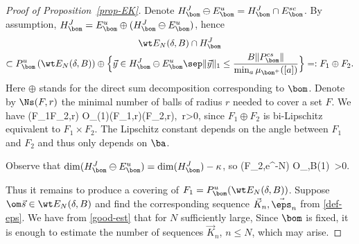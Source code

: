 \begin{proof}[Proof of Proposition~\ref{prop-EK}]
Denote $H_\bom^J \ominus E_\bom^u = H^J_{\bom}\cap E^{sc}_\bom$.
By assumption, $H_\bom^J = E^u_\bom \oplus (H_\bom^J \ominus E_\bom^u)$, hence
\begin{multline}
\label{eq-prod}
\wt E_N(\delta,B)\cap H_\bom^J\\
\subset P_\bom^u\left(\wt E_N(\delta,B)\right) \oplus \Bigl\{\vec y\in H_\bom^J \ominus E_\bom^u\sep \|\vec y\|_1 \le \frac{B\|P_\bom^{cs}\|}{\min_a\mu_{\bom^+}([a])}\Bigr\}=: F_1\oplus F_2.
\end{multline}
Here $\oplus$ stands for the direct sum decomposition corresponding to $\bom$. Denote by $\Ns(F,r)$ the minimal number of balls of radius $r$ needed to cover a set $F$. We have
\be \label{eq-produ2}
\Ns(F_1\oplus F_2,r) \le O_\bom(1)\cdot \Ns(F_1,r)\cdot \Ns(F_2,r),\quad {}\ r>0,
\ee
since $F_1\oplus F_2$ is bi-Lipschitz equivalent to $F_1\times F_2$. The Lipschitz constant depends on the angle between $F_1$ and $F_2$ and thus only depends on $\ba$.

Observe that $\dim(H_\bom^J \ominus E_\bom^u)=\dim(H_\bom^J)-\kappa$, so
\be \label{cover1}
\Ns(F_2,e^{-\alpha N}) \le O_{\bom,B}(1)\cdot \exp{}\quad {}\ \alpha>0.
\ee

Thus it remains to produce a covering of $F_1=P_\bom^u(\wt E_N(\delta,B))$.
Suppose $\om\vec{s} \in \wt E_N(\delta,B)$ and find the
corresponding sequence $\vec K_{n}, \vec\eps_{n}$ from \eqref{def-eps}. We have from \eqref{good-est} that for $N$ sufficiently large,
\be \label{eqrad}
\ee
Since $\bom$ is fixed, it is enough to estimate
the number of sequences $\vec K_{n}$, $n\le N$, which may arise.


\end{proof}
